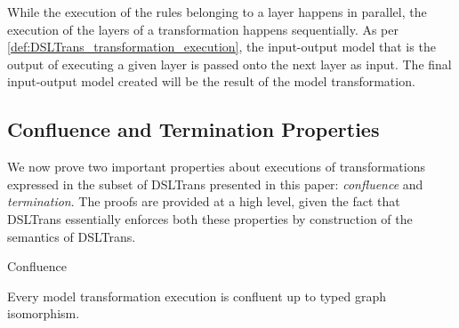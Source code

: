 While the execution of the rules belonging to a layer happens in parallel, the execution of the layers of a transformation happens sequentially. As per \cref{def:DSLTrans_transformation_execution}, the input-output model that is the output of executing a given layer is passed onto the next layer as input. The final input-output model created will be the result of the model transformation.



\subsection{Confluence and Termination Properties}

We now prove two important properties about executions of transformations expressed in the subset of DSLTrans presented in this paper: \emph{confluence} and \emph{termination}. The proofs are provided at a high level, given the fact that DSLTrans essentially enforces both these properties by construction of the semantics of DSLTrans.

\begin{proposition}{Confluence}

Every model transformation execution is confluent up to typed graph isomorphism.



\end{proposition}

